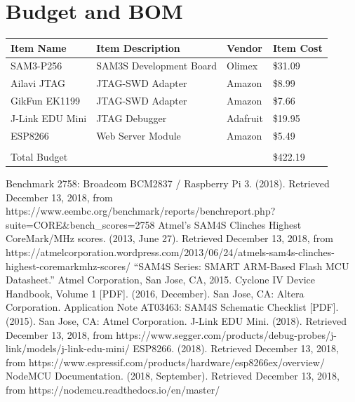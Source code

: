 \documentclass[12pt]{article}
\begin{document}
\section{Budget and BOM}

\begin{center}
	\begin{tabular}{llll}
	Item Name & Item Description & Vendor & Item Cost \\
	\hline
	SAM3-P256 & SAM3S Development Board & Olimex & \$31.09 \\
	Ailavi JTAG & JTAG-SWD Adapter & Amazon & \$8.99  \\
	GikFun EK1199 & JTAG-SWD Adapter & Amazon & \$7.66 \\
	J-Link EDU Mini & JTAG Debugger & Adafruit & \$19.95 \\
	ESP8266  & Web Server Module & Amazon & \$5.49 \\
	& & & \\
	Total Budget & & & \$422.19
	\end{tabular}

\end{center}

\begin{thebibliography}{999}
        Benchmark 2758: Broadcom BCM2837 / Raspberry Pi 3. (2018). 
        Retrieved December 13, 2018, from https://www.eembc.org/benchmark/reports/benchreport.php?
        suite=CORE&bench\_scores=2758
        Atmel's SAM4S Clinches Highest CoreMark/MHz scores. (2013, June 27). Retrieved December 13, 2018, from https://atmelcorporation.wordpress.com/2013/06/24/atmels-sam4s-clinches-highest-coremarkmhz-scores/
        “SAM4S Series: SMART ARM-Based Flash MCU Datasheet.”
        Atmel Corporation, San Jose, CA, 2015.
        Cyclone IV Device Handbook, Volume 1 [PDF].
        (2016, December).
        San Jose, CA: Altera Corporation.
        Application Note AT03463: SAM4S Schematic Checklist [PDF].
        (2015).
        San Jose, CA: Atmel Corporation.
        J-Link EDU Mini.
        (2018). 
        Retrieved December 13, 2018, from https://www.segger.com/products/debug-probes/j-link/models/j-link-edu-mini/
        ESP8266.
        (2018).
        Retrieved December 13, 2018, from https://www.espressif.com/products/hardware/esp8266ex/overview/
        NodeMCU Documentation.
        (2018, September).
        Retrieved December 13, 2018, from https://nodemcu.readthedocs.io/en/master/
\end{thebibliography}
\end{document}
